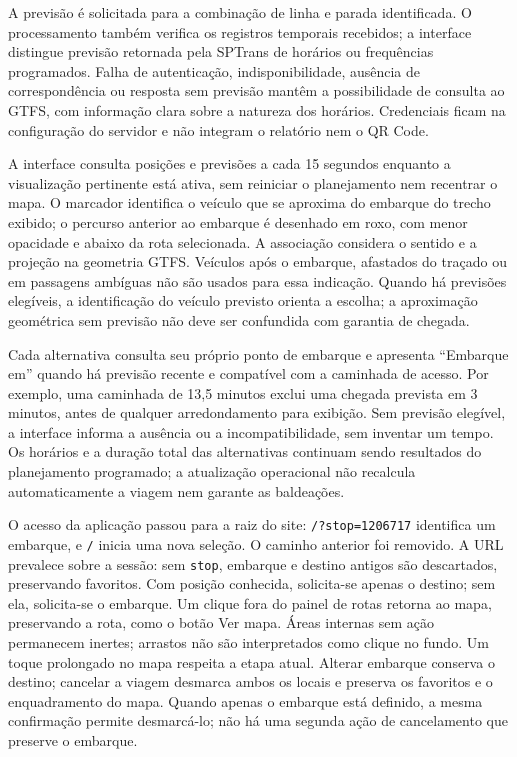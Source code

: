 \documentclass[12pt,oneside,a4paper,brazil,chapter=TITLE]{abntex2}
\begin{document}
\begin{apendicesenv}
A previsão é solicitada para a combinação de linha e parada identificada. O processamento também verifica os registros temporais recebidos; a interface distingue previsão retornada pela SPTrans de horários ou frequências programados. Falha de autenticação, indisponibilidade, ausência de correspondência ou resposta sem previsão mantêm a possibilidade de consulta ao GTFS, com informação clara sobre a natureza dos horários. Credenciais ficam na configuração do servidor e não integram o relatório nem o QR Code.

A interface consulta posições e previsões a cada 15 segundos enquanto a visualização pertinente está ativa, sem reiniciar o planejamento nem recentrar o mapa. O marcador identifica o veículo que se aproxima do embarque do trecho exibido; o percurso anterior ao embarque é desenhado em roxo, com menor opacidade e abaixo da rota selecionada. A associação considera o sentido e a projeção na geometria GTFS. Veículos após o embarque, afastados do traçado ou em passagens ambíguas não são usados para essa indicação. Quando há previsões elegíveis, a identificação do veículo previsto orienta a escolha; a aproximação geométrica sem previsão não deve ser confundida com garantia de chegada.

Cada alternativa consulta seu próprio ponto de embarque e apresenta ``Embarque em'' quando há previsão recente e compatível com a caminhada de acesso. Por exemplo, uma caminhada de 13,5 minutos exclui uma chegada prevista em 3 minutos, antes de qualquer arredondamento para exibição. Sem previsão elegível, a interface informa a ausência ou a incompatibilidade, sem inventar um tempo. Os horários e a duração total das alternativas continuam sendo resultados do planejamento programado; a atualização operacional não recalcula automaticamente a viagem nem garante as baldeações.

O acesso da aplicação passou para a raiz do site: \texttt{/?stop=1206717} identifica um embarque, e \texttt{/} inicia uma nova seleção. O caminho anterior foi removido. A URL prevalece sobre a sessão: sem \texttt{stop}, embarque e destino antigos são descartados, preservando favoritos. Com posição conhecida, solicita-se apenas o destino; sem ela, solicita-se o embarque. Um clique fora do painel de rotas retorna ao mapa, preservando a rota, como o botão Ver mapa. Áreas internas sem ação permanecem inertes; arrastos não são interpretados como clique no fundo. Um toque prolongado no mapa respeita a etapa atual. Alterar embarque conserva o destino; cancelar a viagem desmarca ambos os locais e preserva os favoritos e o enquadramento do mapa. Quando apenas o embarque está definido, a mesma confirmação permite desmarcá-lo; não há uma segunda ação de cancelamento que preserve o embarque.



\end{apendicesenv}
\end{document}
